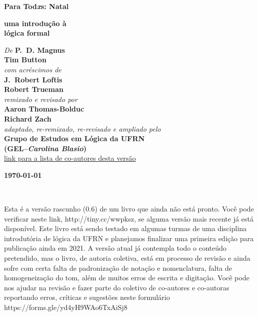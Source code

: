 

\pagestyle{empty}

\vspace*{80pt}

\begin{raggedleft}
\fontsize{30pt}{24pt}\sffamily
\selectfont
  \textbf{Para Tod{\fontsize{37pt}{24pt}\selectfont\rmfamily\textit{x}}s:
  Natal}

\medskip\fontsize{18pt}{20pt}\selectfont

\textbf{uma introdução à\\ lógica formal}





\vfill
\fontsize{12pt}{16pt}\selectfont \textit{De } \textbf{P.~D. Magnus}\\
\textbf{Tim Button}\\
\textit{com acréscimos de}\\
\textbf{J.~Robert Loftis}\\
\textbf{Robert Trueman}\\
\textit{remixado e revisado por}\\
\textbf{Aaron Thomas-Bolduc}\\ \textbf{Richard Zach}\\
\textit{adaptado, re-remixado, re-revisado e ampliado  pelo}\\ \textbf{Grupo de Estudos em Lógica da UFRN \\ (GEL--\textit{Carolina Blasio})}\\
\href{http://danieldurante.weebly.com}{{\small link para a lista de co-autores desta versão}}

\vfill
\textbf{\today}\par
\end{raggedleft}


\newpage

\thispagestyle{empty}
\onecolumn
\ 
\vfill

\parbox{3 in}{
Esta é a versão rascunho (0.6) de um livro que ainda não está pronto.
Você pode verificar neste link, \hbox{http://tiny.cc/wwpksz}, se alguma versão mais recente já está disponível.
Este livro está sendo testado em algumas turmas de uma disciplina introdutória de lógica da UFRN e planejamos finalizar uma primeira edição para publicação ainda em 2021. 
A versão atual já contempla todo o conteúdo pretendido, mas o livro, de autoria coletiva, está em processo de revisão e ainda sofre com certa falta de padronização de notação e nomenclatura, falta de homogeneização do tom, além de muitos erros de escrita e digitação.
Você pode nos ajudar na revisão e fazer parte do coletivo de co-autores e co-autoras reportando erros, críticas e sugestões neste formulário
\hbox{https://forms.gle/yd4yH9WAo6TxAiSj8} 
}

